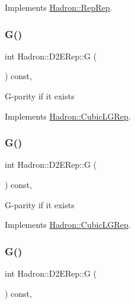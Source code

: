 Implements \mbox{\hyperlink{structHadron_1_1RepRep_a92c8802e5ed7afd7da43ccfd5b7cd92b}{Hadron\+::\+Rep\+Rep}}.

\mbox{\label{structHadron_1_1D2ERep_a5ba7e32b685da5cc0ba1e1bca3a930eb}} 
\subsubsection{\texorpdfstring{G()}{G()}\hspace{0.1cm}{\footnotesize\ttfamily [1/3]}}
{\footnotesize\ttfamily int Hadron\+::\+D2\+E\+Rep\+::G (\begin{DoxyParamCaption}{ }\end{DoxyParamCaption}) const\hspace{0.3cm}{\ttfamily [inline]}, {\ttfamily [virtual]}}

G-\/parity if it exists 

Implements \mbox{\hyperlink{structHadron_1_1CubicLGRep_ace26f7b2d55e3a668a14cb9026da5231}{Hadron\+::\+Cubic\+L\+G\+Rep}}.

\mbox{\label{structHadron_1_1D2ERep_a5ba7e32b685da5cc0ba1e1bca3a930eb}} 
\subsubsection{\texorpdfstring{G()}{G()}\hspace{0.1cm}{\footnotesize\ttfamily [2/3]}}
{\footnotesize\ttfamily int Hadron\+::\+D2\+E\+Rep\+::G (\begin{DoxyParamCaption}{ }\end{DoxyParamCaption}) const\hspace{0.3cm}{\ttfamily [inline]}, {\ttfamily [virtual]}}

G-\/parity if it exists 

Implements \mbox{\hyperlink{structHadron_1_1CubicLGRep_ace26f7b2d55e3a668a14cb9026da5231}{Hadron\+::\+Cubic\+L\+G\+Rep}}.

\mbox{\label{structHadron_1_1D2ERep_a5ba7e32b685da5cc0ba1e1bca3a930eb}} 
\subsubsection{\texorpdfstring{G()}{G()}\hspace{0.1cm}{\footnotesize\ttfamily [3/3]}}
{\footnotesize\ttfamily int Hadron\+::\+D2\+E\+Rep\+::G (\begin{DoxyParamCaption}{ }\end{DoxyParamCaption}) const\hspace{0.3cm}{\ttfamily [inline]}, {\ttfamily [virtual]}}

